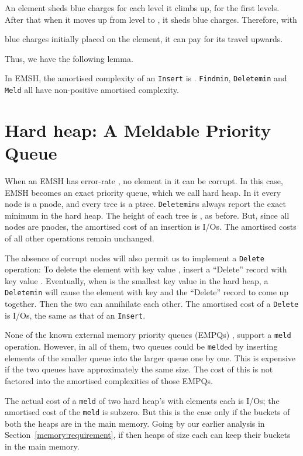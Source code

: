 An element sheds  blue charges for each level it climbs up, for the first
 levels. After that when it moves up from level  to , it
sheds  blue charges. Therefore, with 

blue charges initially placed on the element, it can pay for its travel upwards. 

Thus, we have the following lemma.
\begin{lemma}
In EMSH, the amortised complexity of an {\tt Insert} is . {\tt Findmin}, {\tt Deletemin} and {\tt Meld} all have non-positive amortised complexity.
\end{lemma}

\section{Hard heap: A Meldable Priority Queue}
\label{hard:emsh}
When an EMSH has error-rate , no element in it can be corrupt.
In this case, EMSH becomes an exact priority queue, which we call hard heap.
In it every node is a pnode, and every tree is a ptree. 
{\tt Deletemin}s always report the exact minimum in the hard heap. 
The height of each tree is , as before.
But, since all nodes are pnodes, the amortised cost of an insertion is
 I/Os. The amortised costs of all 
other operations remain unchanged.

The absence of corrupt nodes will also permit us to implement a {\tt Delete}
operation: To delete the element with key value , insert a ``Delete'' record
with key value . Eventually, when  is the smallest key value in the hard heap,
a {\tt Deletemin} will cause
the element with key  and the ``Delete'' record to come up together. Then the
two can annihilate each other. The amortised cost of a {\tt Delete} is
 I/Os, the same as that of an {\tt Insert}.
 
None of the known external memory priority queues (EMPQs) \cite{Arge03,FJKT99,KS96},
support a {\tt meld} operation. However, in all of them, two queues could be {\tt meld}ed by 
inserting elements of the smaller queue into the larger queue one by one.
This is expensive if the two queues have approximately the same size.
The cost of this is not factored into the amortised complexities of those
EMPQs. 

The actual cost of a {\tt meld} of two hard heap's with  elements each is
 I/Os; the amortised cost of the {\tt meld} is subzero.
But this is the case only if the buckets of
both the heaps are in the main memory. Going by our earlier analysis in Section~\ref{memory:requirement},
if  then  heaps of size  each can keep their buckets in the main memory.

